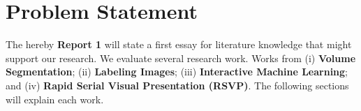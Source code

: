 \section{Problem Statement}

The hereby \textbf{Report 1} will state a first essay for literature knowledge that might support our research. We evaluate several research work. Works from (i) \textbf{Volume Segmentation}; (ii) \textbf{Labeling Images}; (iii) \textbf{Interactive Machine Learning}; and (iv) \textbf{Rapid Serial Visual Presentation (RSVP)}. The following sections will explain each work.